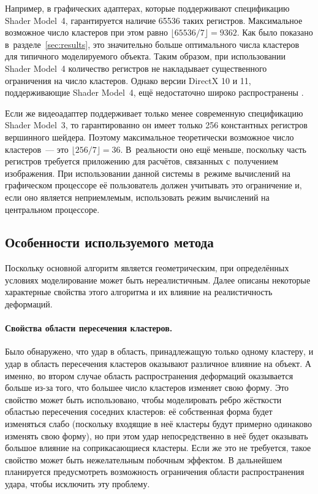 \documentclass[a4paper, 14pt, titlepage]{extarticle}
\newcommand{\eng}[1]{{\English #1}}
\begin{document}
        Например, в графических адаптерах, которые поддерживают спецификацию \eng{Shader Model~4},
        гарантируется наличие 65536 таких регистров. Максимальное возможное число
        кластеров при этом равно $\lfloor 65536/7 \rfloor = 9362$. Как было показано
        в~разделе~\ref{sec:results}, это значительно больше оптимального числа кластеров для
        типичного моделируемого объекта. Таким образом, при использовании \eng{Shader Model~4}
        количество регистров не накладывает существенного ограничения на число кластеров. Однако
        версии DirectX 10 и 11, поддерживающие \eng{Shader Model~4}, ещё недостаточно широко
        распространены \cite{steam-hardware}.

        Если же видеоадаптер поддерживает только менее современную спецификацию \eng{Shader
        Model~3}, то гарантированно он имеет только 256 константных регистров вершинного шейдера.
        Поэтому максимальное теоретически возможное число кластеров~--- это $\lfloor 256/7 \rfloor = 36$.
        В~реальности оно ещё меньше, поскольку часть регистров требуется приложению для
        расчётов, связанных с~получением изображения. При использовании данной системы в~режиме
        вычислений на графическом процессоре её пользователь должен учитывать это ограничение и,
        если оно является неприемлемым, использовать режим вычислений на центральном процессоре.

    \subsection{Особенности используемого метода}

        Поскольку основной алгоритм является геометрическим, при определённых условиях моделирование
        может быть нереалистичным. Далее описаны некоторые характерные свойства этого алгоритма и их
        влияние на реалистичность деформаций.

        \paragraph{Свойства области пересечения кластеров.} Было обнаружено, что удар в область,
        принадлежащую только одному кластеру, и удар в область пересечения кластеров оказывают
        различное влияние на объект. А именно, во втором случае область распространения деформаций
        оказывается больше из-за того, что большее число кластеров изменяет свою форму. Это свойство
        может быть использовано, чтобы моделировать ребро жёсткости областью пересечения соседних
        кластеров: её собственная форма будет изменяться слабо (поскольку входящие в неё кластеры
        будут примерно одинаково изменять свою форму), но при этом удар непосредственно в неё будет
        оказывать большое влияние на соприкасающиеся кластеры. Если же это не требуется, такое
        свойство может быть нежелательным побочным эффектом. В дальнейшем планируется предусмотреть
        возможность ограничения области распространения удара, чтобы исключить эту проблему.
\end{document}
